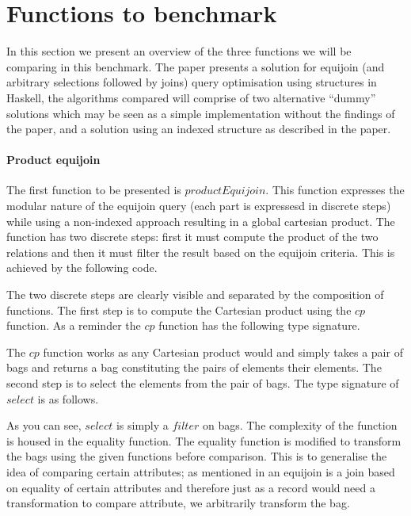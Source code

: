 \section{Functions to benchmark}
In this section we present an overview of the three functions we will
be comparing in this benchmark. The paper \relalg{} presents a solution for
equijoin (and arbitrary selections followed by joins) query optimisation using
structures in Haskell, the algorithms compared will comprise of two alternative
``dummy'' solutions which may be seen as a simple implementation without the
findings of the paper, and a solution using an indexed structure as described
in the paper.

\paragraph{Product equijoin} The first function to be presented is
$productEquijoin$. This function
expresses the modular nature of the equijoin query (each part is expressesd in
discrete steps) while using a non-indexed approach resulting in a global
cartesian product.
The function has two discrete steps: first it must compute the product of the
two relations and then it must filter the result based on the equijoin criteria.
This is achieved by the following code.



\noindent
The two discrete steps are clearly visible and separated by the composition of
functions. The first step is to compute the Cartesian product using the
$cp$ function. As a reminder the $cp$ function has
the following type signature.


\noindent
The $cp$ function works as any Cartesian product would and simply takes a pair of bags and
returns a bag constituting the pairs of elements their elements.
The second step is to select the elements from the pair of
bags. The type signature of $select$ is as follows.


\noindent
As you can see, $select$ is simply a
$filter$ on bags. The complexity of the function is housed in the
equality function. The equality function is modified to transform the bags using
the given functions before comparison. This is to generalise the idea of
comparing certain attributes; as mentioned in  an
equijoin is a join based on equality of certain attributes and therefore just as
a record would need a transformation to compare attribute, we arbitrarily
transform the bag.

